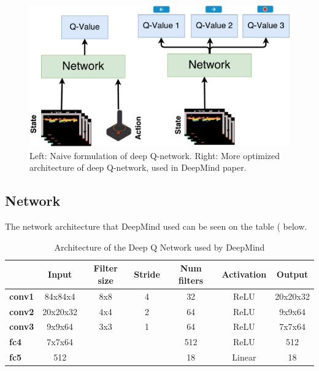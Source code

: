 \begin{figure}[H]
	\centering
	\includegraphics[width=1\textwidth]{Figures/Architecture/DQN/DQN_two_approach.pdf}
	\caption{Left: Naive formulation of deep Q-network. Right: More optimized architecture of deep Q-network, used in DeepMind paper.} 
	\label{fig:DQN_two_approach}
\end{figure}    

\subsection{Network}
The network architecture that DeepMind used can be seen on the table ( below. 

\begin{table}[H]
	\centering
	\caption{Architecture of the Deep Q Network used by DeepMind}
	\label{tab:DQN_network}
	\begin{tabular}{|l|c|c|c|c|c|c|}
		\hline
		\rowcolor[HTML]{9B9B9B} 
		\multicolumn{1}{|c|}{\cellcolor[HTML]{9B9B9B}\textbf{Layer}} & \textbf{Input} & \textbf{Filter size} & \textbf{Stride} & \textbf{Num filters} & \textbf{Activation} & \textbf{Output} \\ \hline
		\cellcolor[HTML]{FFFFFF}\textbf{conv1}                       & 84x84x4        & 8x8                  & 4               & 32                   & ReLU                & 20x20x32        \\ \hline
		\rowcolor[HTML]{C0C0C0} 
		\textbf{conv2}                                               & 20x20x32       & 4x4                  & 2               & 64                   & ReLU                & 9x9x64          \\ \hline
		\cellcolor[HTML]{FFFFFF}\textbf{conv3}                       & 9x9x64         & 3x3                  & 1               & 64                   & ReLU                & 7x7x64          \\ \hline
		\rowcolor[HTML]{C0C0C0} 
		\textbf{fc4}                                                 & 7x7x64         &                      &                 & 512                  & ReLU                & 512             \\ \hline
		\cellcolor[HTML]{FFFFFF}\textbf{fc5}                         & 512            &                      &                 & 18                   & Linear              & 18              \\ \hline
	\end{tabular}
\end{table}

